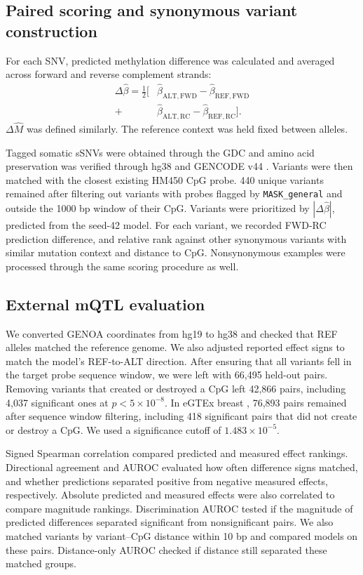 \documentclass[11pt,letterpaper]{article}
\begin{document}
\subsection{Paired scoring and synonymous variant construction}
For each SNV, predicted methylation difference was calculated and averaged across forward and reverse complement strands: 
\begin{align*}
\Delta\widehat\beta=\tfrac12\big[&\widehat\beta_{\mathrm{ALT,FWD}}-\widehat\beta_{\mathrm{REF,FWD}}\\
+&\widehat\beta_{\mathrm{ALT,RC}}-\widehat\beta_{\mathrm{REF,RC}}\big].
\end{align*}
$\Delta\widehat M$ was defined similarly. The reference context was held fixed between alleles. 

Tagged somatic sSNVs were obtained through the GDC and amino acid preservation was verified through hg38 and GENCODE v44 \cite{grossman2016gdc,frankish2021gencode}. Variants were then matched with the closest existing HM450 CpG probe. 440 unique variants remained after filtering out variants with probes flagged by \texttt{MASK\_general} and outside the 1000 bp window of their CpG.
Variants were prioritized by $|\Delta\widehat\beta|$, predicted from the seed-42 model. For each variant, we recorded FWD-RC prediction difference, and relative rank against other synonymous variants with similar mutation context and distance to CpG. Nonsynonymous examples were processed through the same scoring procedure as well. 

\subsection{External mQTL evaluation}
We converted GENOA coordinates \cite{shang2023genoa} from hg19 to hg38 and checked that REF alleles matched the reference genome. We also adjusted reported effect signs to match the model's REF-to-ALT direction. After ensuring that all variants fell in the target probe sequence window, we were left with 66,495 held-out pairs. Removing variants that created or destroyed a CpG left 42,866 pairs, including 4,037 significant ones at $p<5\times10^{-8}$. In eGTEx breast \cite{oliva2023mqtl}, 76,893 pairs remained after sequence window filtering, including 418 significant pairs that did not create or destroy a CpG. We used a significance cutoff of $1.483\times10^{-5}$. 

Signed Spearman correlation compared predicted and measured effect rankings. Directional agreement and AUROC evaluated how often difference signs matched, and whether predictions separated positive from negative measured effects, respectively. Absolute predicted and measured effects were also correlated to compare magnitude rankings. Discrimination AUROC tested if the magnitude of predicted differences separated significant from nonsignificant pairs. We also matched variants by variant--CpG distance within 10 bp and compared models on these pairs. Distance-only AUROC checked if distance still separated these matched groups.
\end{document}
